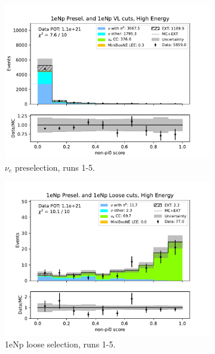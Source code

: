 \begin{figure}[H]
\begin{subfigure}{0.33\linewidth}
    \includegraphics[width=\linewidth]{technote/Sidebands/Figures/FarSideband/far_sideband_nonpi0_score_run1234b4c4d5_NP_NP_HIGH_ENERGY.pdf}
    \caption{$\nu_e$ preselection, runs 1-5.}
    \end{subfigure}%
    \begin{subfigure}{0.33\linewidth}
    \includegraphics[width=\linewidth]{technote/Sidebands/Figures/FarSideband/far_sideband_nonpi0_score_run1234b4c4d5_NP_NPL_HIGH_ENERGY.pdf}
    \caption{1eNp loose selection, runs 1-5.}
    \end{subfigure}%
    \begin{subfigure}{0.33\linewidth}

\end{subfigure}
\end{figure}
